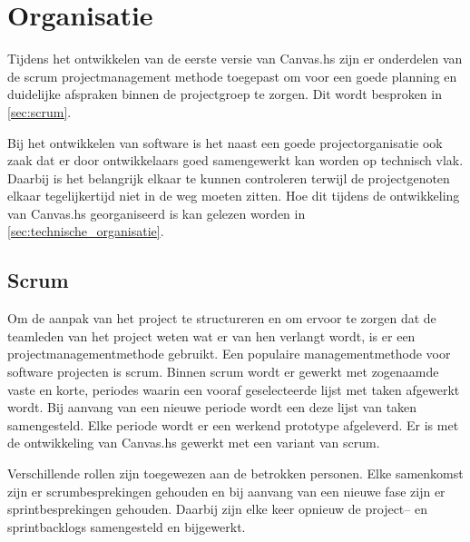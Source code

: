 \chapter{Organisatie} \label{hoofdstuk:organisatie}
Tijdens het ontwikkelen van de eerste versie van Canvas.hs zijn er onderdelen van de scrum projectmanagement methode toegepast om voor een goede planning en duidelijke afspraken binnen de projectgroep te zorgen. Dit wordt besproken in \autoref{sec:scrum}.

Bij het ontwikkelen van software is het naast een goede projectorganisatie ook zaak dat er door ontwikkelaars goed samengewerkt kan worden op technisch vlak. Daarbij is het belangrijk elkaar te kunnen controleren terwijl de projectgenoten elkaar tegelijkertijd niet in de weg moeten zitten. Hoe dit tijdens de ontwikkeling van Canvas.hs georganiseerd is kan gelezen worden in \autoref{sec:technische_organisatie}.

\section{Scrum} \label{sec:scrum}
Om de aanpak van het project te structureren en om ervoor te zorgen dat de teamleden van het project weten wat er van hen verlangt wordt, is er een projectmanagementmethode gebruikt. Een populaire managementmethode voor software projecten is scrum. Binnen scrum wordt er gewerkt met zogenaamde vaste en korte, periodes waarin een vooraf geselecteerde lijst met taken afgewerkt wordt. Bij aanvang van een nieuwe periode wordt een deze lijst van taken samengesteld. Elke periode wordt er een werkend prototype afgeleverd. Er is met de ontwikkeling van Canvas.hs gewerkt met een variant van scrum.

Verschillende rollen zijn toegewezen aan de betrokken personen. Elke samenkomst zijn er scrumbesprekingen gehouden en bij aanvang van een nieuwe fase zijn er sprintbesprekingen gehouden. Daarbij zijn elke keer opnieuw de project– en sprintbacklogs samengesteld en bijgewerkt.

